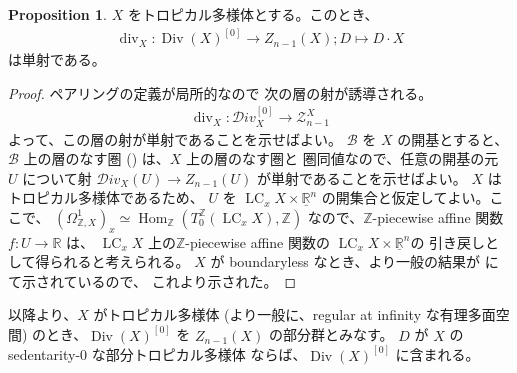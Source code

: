 \documentclass[a4paper,dvipdfmx,reqno,12pt]{amsart}
\theoremstyle{definition}
\newtheorem{proposition}[theorem]{Proposition}
\newcommand{\opn}[1]{\operatorname{#1}}
\numberwithin{equation}{section}
\begin{document}
\begin{proposition}
$X$ をトロピカル多様体とする。このとき、
\begin{align}
\opn{div}_X\colon
\opn{Div}(X)^{[0]}\to Z_{n-1}(X); D\mapsto D\cdot X    
\end{align}
は単射である。
\end{proposition}
\begin{proof}
ペアリングの定義が局所的なので
次の層の射が誘導される。
\begin{align}
\opn{div}_X\colon \mathcal{D}iv_X^{[0]}\to 
\mathscr{Z}_{n-1}^{X}
\end{align}
よって、この層の射が単射であることを示せばよい。
$\mathcal{B}$ を $X$ の開基とすると、
$\mathcal{B}$ 上の層のなす圏
(\cite[p.49-50]{MR2675155})
は、$X$ 上の層のなす圏と
圏同値なので、任意の開基の元 $U$ について射
$\mathcal{D}iv_X(U)\to Z_{n-1}(U)$
が単射であることを示せばよい。
$X$ はトロピカル多様体であるため、
$U$ を 
$\opn{LC}_x X\times \underline{\mathbb{R}}^{n}$
の開集合と仮定してよい。ここで、
$(\Omega_{\mathbb{Z},X}^{1})_{x}
\simeq \opn{Hom}_{\mathbb{Z}}
(T^{\mathbb{Z}}_0 (\opn{LC}_x X),\mathbb{Z})$
なので、$\mathbb{Z}$-piecewise affine 関数
$f\colon U\to \mathbb{R}$ は、
$\opn{LC}_x X$ 上の$\mathbb{Z}$-piecewise affine 関数の
$\opn{LC}_x X\times \underline{\mathbb{R}}^{n}$の
引き戻しとして得られると考えられる。
$X$ が boundaryless なとき、より一般の結果が
\cite[Theorem 4.5]{MR4246795} にて示されているので、
これより示された。
\end{proof}

以降より、$X$ がトロピカル多様体
(より一般に、regular at infinity な有理多面空間)
のとき、$\opn{Div}(X)^{[0]}$ を 
$Z_{n-1}(X)$ の部分群とみなす。
$D$ が $X$ の sedentarity-0 な部分トロピカル多様体
ならば、$\opn{Div}(X)^{[0]}$ に含まれる。
\end{document}
